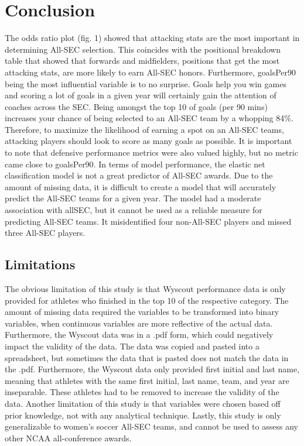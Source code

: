 \documentclass{article}
\begin{document}
\section{Conclusion}
The odds ratio plot (fig. 1) showed that attacking stats are the most important in determining All-SEC selection. This coincides with the positional breakdown table that showed that forwards and midfielders, positions that get the most attacking stats, are more likely to earn All-SEC honors. Furthermore, goalsPer90 being the most influential variable is to no surprise. Goals help you win games and scoring a lot of goals in a given year will certainly gain the attention of coaches across the SEC. Being amongst the top 10 of goals (per 90 mins) increases your chance of being selected to an All-SEC team by a whopping 84\%. Therefore, to maximize the likelihood of earning a spot on an All-SEC teams, attacking players should look to score as many goals as possible. It is important to note that defensive performance metrics were also valued highly, but no metric came close to goalsPer90.
In terms of model performance, the elastic net classification model is not a great predictor of All-SEC awards. Due to the amount of missing data, it is difficult to create a model that will accurately predict the All-SEC teams for a given year. The model had a moderate association with allSEC, but it cannot be used as a reliable measure for predicting All-SEC teams. It misidentified four non-All-SEC players and missed three All-SEC players. 

\subsection{Limitations}
The obvious limitation of this study is that Wyscout performance data is only provided for athletes who finished in the top 10 of the respective category. The amount of missing data required the variables to be transformed into binary variables, when continuous variables are more reflective of the actual data. Furthermore, the Wyscout data was in a .pdf form, which could negatively impact the validity of the data. The data was copied and pasted into a spreadsheet, but sometimes the data that is pasted does not match the data in the .pdf. Furthermore, the Wyscout data only provided first initial and last name, meaning that athletes with the same first initial, last name, team, and year are inseparable. These athletes had to be removed to increase the validity of the data. Another limitation of this study is that variables were chosen based off prior knowledge, not with any analytical technique. Lastly, this study is only generalizable to women’s soccer All-SEC teams, and cannot be used to assess any other NCAA all-conference awards.
\end{document}

